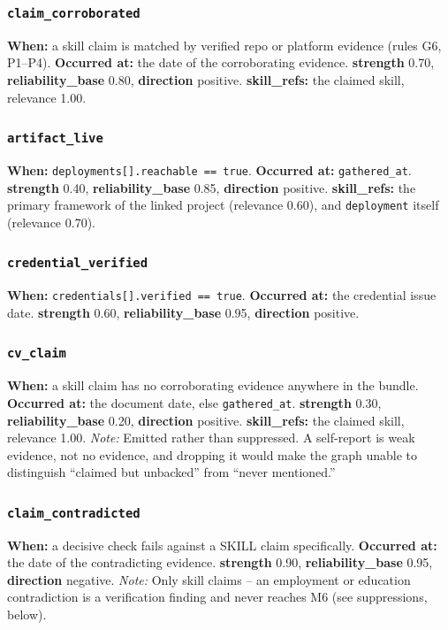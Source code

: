 \documentclass[10pt,a4paper]{article}
\begin{document}
\subsubsection*{\texttt{claim\_corroborated}}
\textbf{When:} a skill claim is matched by verified repo or platform
evidence (rules G6, P1--P4). \textbf{Occurred at:} the date of the
corroborating evidence. \textbf{strength} 0.70, \textbf{reliability\_base}
0.80, \textbf{direction} positive. \textbf{skill\_refs:} the claimed skill,
relevance 1.00.

\subsubsection*{\texttt{artifact\_live}}
\textbf{When:} \texttt{deployments[].reachable == true}. \textbf{Occurred
at:} \texttt{gathered\_at}. \textbf{strength} 0.40, \textbf{reliability\_base}
0.85, \textbf{direction} positive. \textbf{skill\_refs:} the primary
framework of the linked project (relevance 0.60), and \texttt{deployment}
itself (relevance 0.70).

\subsubsection*{\texttt{credential\_verified}}
\textbf{When:} \texttt{credentials[].verified == true}. \textbf{Occurred
at:} the credential issue date. \textbf{strength} 0.60,
\textbf{reliability\_base} 0.95, \textbf{direction} positive.

\subsubsection*{\texttt{cv\_claim}}
\textbf{When:} a skill claim has no corroborating evidence anywhere in the
bundle. \textbf{Occurred at:} the document date, else \texttt{gathered\_at}.
\textbf{strength} 0.30, \textbf{reliability\_base} 0.20, \textbf{direction}
positive. \textbf{skill\_refs:} the claimed skill, relevance 1.00.
\emph{Note:} Emitted rather than suppressed. A self-report is weak evidence,
not no evidence, and dropping it would make the graph unable to distinguish
``claimed but unbacked'' from ``never mentioned.''

\subsubsection*{\texttt{claim\_contradicted}}
\textbf{When:} a decisive check fails against a SKILL claim specifically.
\textbf{Occurred at:} the date of the contradicting evidence.
\textbf{strength} 0.90, \textbf{reliability\_base} 0.95, \textbf{direction}
\textcolor{negative}{negative}. \emph{Note:} Only skill claims -- an
employment or education contradiction is a verification finding and never
reaches M6 (see suppressions, below).
\end{document}

